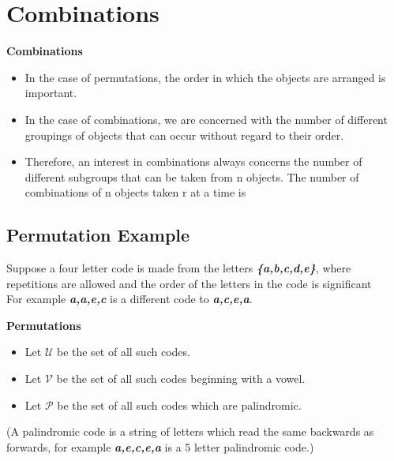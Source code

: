 \documentclass[]{report}
\begin{document}
	
	
	\section{Combinations}
	
	\textbf{Combinations}
	\begin{itemize}
		\item In the case of permutations, the order in which the objects are arranged is important.
		\item In the case of
		combinations, we are concerned with the number of different groupings of objects that can occur without regard
		to their order. 
		\item Therefore, an interest in combinations always concerns the number of different subgroups that
		can be taken from n objects. The number of combinations of n objects taken r at a time is
	\end{itemize}	
	
	
	\subsection{Permutation Example}
	
	
	Suppose a four letter code is made from the letters \textbf{\textit{\{a,b,c,d,e\}}}, where repetitions are allowed and the order of the letters in the code is significant\\ \bigskip For example
	\textbf{\textit{a,a,e,c}} is a different code to \textbf{\textit{a,c,e,a}}.
	
	
	
	
	
	\textbf{Permutations}
	
	\begin{itemize}
		\item Let $\mathcal{U}$ be the set of all such codes.
		\item Let $\mathcal{V}$ be the set of all such codes beginning with a vowel.
		\item Let $\mathcal{P}$ be the set of all such codes which are palindromic.
	\end{itemize} 
	\bigskip
	(A palindromic code is a string of letters which read the same backwards as forwards, for example \textbf{\textit{a,e,c,e,a}} is a 5 letter palindromic code.)\\ \bigskip
	
	
	
	
	
\end{document}
